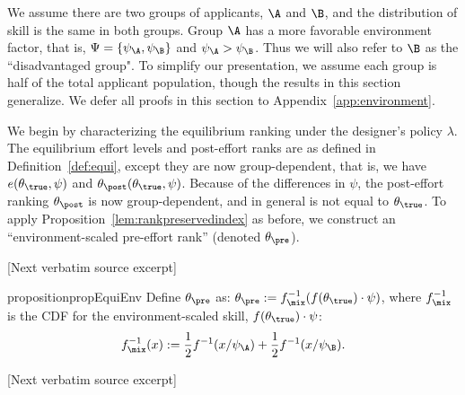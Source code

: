 \documentclass[10pt]{article}
\begin{document}
\begin{ReviewVerbatim}
{ We assume there are two groups of applicants, $\A$ and $\B$, and the distribution of skill is the same in both groups. Group $\A$ has a more favorable environment factor, that is,  $\Psi = \{\psi_\A, \psi_\B\}$ and $\psi_\A > \psi_\B$. Thus we will also refer to $\B$ as the ``disadvantaged group". To simplify our presentation, we assume each group is half of the total applicant population, though the results in this section generalize.%
%
We defer all proofs in this section to Appendix~\ref{app:environment}.

We begin by characterizing the equilibrium ranking under the designer's policy $\lambda$. The equilibrium effort levels and post-effort ranks are as defined in Definition~\ref{def:equi}, except they are now group-dependent, that is, we have $e(\theta_\true, \psi)$ and $\theta_\post(\theta_\true, \psi)$. Because of the differences in $\psi$, the post-effort ranking $\theta_\post$ is now group-dependent, and in general is not equal to $\theta_\true$. To apply Proposition~\ref{lem:rankpreservedindex} as before, we construct an ``environment-scaled pre-effort rank'' (denoted $\theta_\pre$).

[Next verbatim source excerpt]

\begin{restatable}{proposition}{propEquiEnv}\label{prop:equi-env}
Define $\theta_\pre$ as:
	\(\theta_\pre := f^{-1}_\mix(f(\theta_\true)\cdot \psi)\),
		where $f^{-1}_\mix$	is the CDF for the environment-scaled skill, $f(\theta_\true)\cdot \psi$:
	\begin{equation*}
	f^{-1}_\mix(x) := \frac{1}{2}f^{-1}(x/\psi_\A)+ \frac{1}{2}f^{-1}(x/\psi_\B).
	\end{equation*}


[Next verbatim source excerpt]


\end{restatable}}
\end{ReviewVerbatim}
\end{document}

